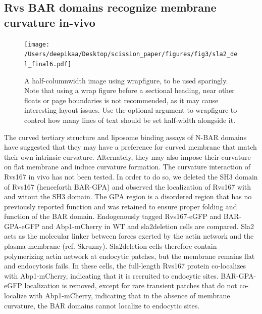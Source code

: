 \documentclass[9pt,lineno]{elife}
\begin{document}



\subsection{Rvs BAR domains recognize membrane curvature in-vivo}

\begin{figure}[h]
	\texttt{[image: /Users/deepikaa/Desktop/scission\_paper/figures/fig3/sla2\_del\_final6.pdf]}
	\caption{A half-columnwidth image using wrapfigure, to be used sparingly. Note that using a wrap figure before a sectional heading, near other floats or page boundaries is not recommended, as it may cause interesting layout issues. Use the optional argument to wrapfigure to control how many lines of text should be set half-width alongside it.}
	\label{fig:halfwidth}
\end{figure}


The curved tertiary structure and liposome binding assays of N-BAR domains have suggested that they may have a preference for curved membrane that match their own intrinsic curvature. Alternately, they may also impose their curvature on flat membrane and induce curvature formation. The curvature interaction of Rvs167 in vivo has not been tested. In order to do so, we deleted the SH3 domain of Rvs167 (henceforth BAR-GPA) and observed the localization of Rvs167 with and witout the SH3 domain. The GPA region is a disordered region that has no previously reported function and was retained to ensure proper folding and function of the BAR domain. Endogenously tagged Rvs167-eGFP and BAR-GPA-eGFP and Abp1-mCherry in WT and sla2deletion cells are compared. Sla2 acts as the molecular linker between forces exerted by the actin network and the plasma membrane (ref. Skruzny). Sla2deletion cells therefore contain polymerizing actin network at endocytic patches, but the membrane remains flat and endocytosis fails. In these cells, the full-length Rvs167 protein co-localizes with Abp1-mCherry, indicating that it is recruited to endocytic sites. BAR-GPA-eGFP localization is removed, except for rare transient patches that do not co-localize with Abp1-mCherry, indicating that in the absence of membrane curvature, the BAR domains  cannot localize to endocytic sites. 
\end{document}
